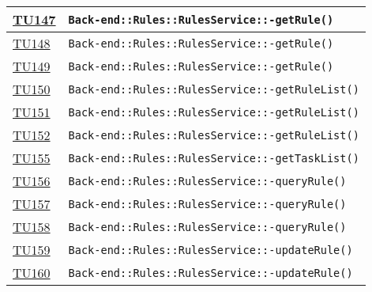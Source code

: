 \begin{longtable}{|>{\centering}m{1cm}|m{12cm}<{\centering}|}
\hyperlink{TU147}{TU147} & \texttt{Back-end::Rules::RulesService::-\linebreak getRule()}\\ \hline

\hyperlink{TU148}{TU148} & \texttt{Back-end::Rules::RulesService::-\linebreak getRule()}\\ \hline

\hyperlink{TU149}{TU149} & \texttt{Back-end::Rules::RulesService::-\linebreak getRule()}\\ \hline

\hyperlink{TU150}{TU150} & \texttt{Back-end::Rules::RulesService::-\linebreak getRuleList()}\\ \hline

\hyperlink{TU151}{TU151} & \texttt{Back-end::Rules::RulesService::-\linebreak getRuleList()}\\ \hline

\hyperlink{TU152}{TU152} & \texttt{Back-end::Rules::RulesService::-\linebreak getRuleList()}\\ \hline

\hyperlink{TU155}{TU155} & \texttt{Back-end::Rules::RulesService::-\linebreak getTaskList()}\\ \hline

\hyperlink{TU156}{TU156} & \texttt{Back-end::Rules::RulesService::-\linebreak queryRule()}\\ \hline

\hyperlink{TU157}{TU157} & \texttt{Back-end::Rules::RulesService::-\linebreak queryRule()}\\ \hline

\hyperlink{TU158}{TU158} & \texttt{Back-end::Rules::RulesService::-\linebreak queryRule()}\\ \hline

\hyperlink{TU159}{TU159} & \texttt{Back-end::Rules::RulesService::-\linebreak updateRule()}\\ \hline

\hyperlink{TU160}{TU160} & \texttt{Back-end::Rules::RulesService::-\linebreak updateRule()}\\ \hline


\end{longtable}
